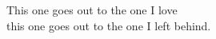 
\vspace*{6.5cm}
\begin{textsl}
{
\large \rmfamily 
\hspace*{2.4cm} This one goes out to the one I love\\
\hspace*{4.8cm} this one goes out to the one I left behind.
}
\end{textsl}


\cleardoublepage

